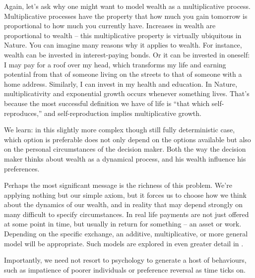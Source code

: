 Again, let's ask why one might want to model wealth as a multiplicative process. Multiplicative processes have the property that how much you gain tomorrow is proportional to how much you currently have. Increases in wealth are proportional to wealth -- this multiplicative property is virtually ubiquitous in Nature. You can imagine many reasons why it applies to wealth. For instance, wealth can be invested in interest-paying bonds. Or it can be invested in oneself: I may pay for a roof over my head, which transforms my life and earning potential from that of someone living on the streets to that of someone with a home address. Similarly, I can invest in my health and education. 
In Nature, multiplicativity and exponential growth occurs whenever something lives. That's because the most successful definition we have of life is ``that which self-reproduces,'' and self-reproduction implies multiplicative growth.

We learn: in this slightly more complex though still fully deterministic case, which option is 
preferable does not only depend on the options available but also on the personal 
circumstances of the decision maker. Both the way the decision maker thinks about wealth as a dynamical process, and his wealth influence his preferences.

Perhaps the most significant message is the richness of this problem. We're applying nothing but our simple axiom, but it forces us to choose how we think about the dynamics of our wealth, and in reality that may depend strongly on many difficult to specify circumstances. In real life payments are not just offered at some point in time, but usually in return for something -- an asset or work. Depending on the specific exchange, an additive, multiplicative, or more general model will be appropriate. Such models are explored in even greater detail in \cite{AdamouETAL2019}. 

Importantly, we need not resort to psychology to generate a host of behaviours, such as impatience of poorer individuals or preference reversal as time ticks on.


